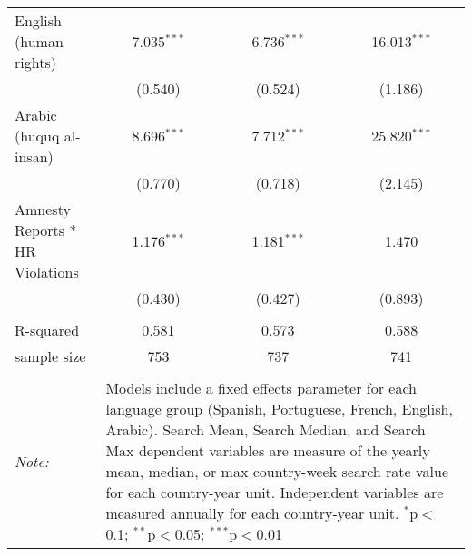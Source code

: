 \begin{table}[!htbp]
\begin{tabular}{@{\extracolsep{5pt}}lccc}
  English (human rights) & 7.035$^{***}$ & 6.736$^{***}$ & 16.013$^{***}$ \\ 
  & (0.540) & (0.524) & (1.186) \\ 
  Arabic (huquq al-insan) & 8.696$^{***}$ & 7.712$^{***}$ & 25.820$^{***}$ \\ 
  & (0.770) & (0.718) & (2.145) \\ 
  Amnesty Reports * HR Violations & 1.176$^{***}$ & 1.181$^{***}$ & 1.470 \\ 
  & (0.430) & (0.427) & (0.893) \\ 
 \hline \\[-1.8ex] 
R-squared  & 0.581 & 0.573 & 0.588 \\ 
sample size  & 753 & 737 & 741 \\ 
\hline 
\hline \\[-1.8ex] 
\textit{Note:}  & \multicolumn{3}{l}{\parbox[t]{8cm}{Models include a fixed effects parameter for each language group (Spanish, Portuguese, French, English, Arabic). Search Mean, Search Median, and Search Max dependent variables are measure of the yearly mean, median, or max country-week search rate value for each country-year unit. Independent variables are measured annually for each country-year unit. $^{*}$p$<$0.1; $^{**}$p$<$0.05; $^{***}$p$<$0.01}} \\ 
\end{tabular} 
\end{table} 
